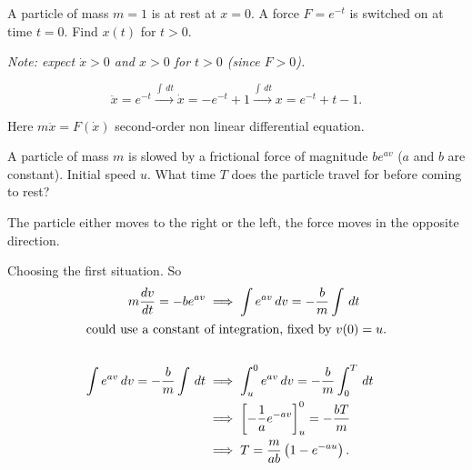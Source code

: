\documentclass[10pt, a4paper]{article}
\begin{document}
\begin{example}
    A particle of mass $m = 1$ is at rest at $x = 0$.
    A force $F = e ^ {-t}$ is switched on at time $t = 0$.
    Find $x(t)$ for $t > 0$.

    \textit{Note:
    expect $\dot{x} > 0$ and $x > 0$ for $t > 0$
    (since $F > 0$).}

    \begin{solution}
        \[
        \ddot{x} = e ^ {-t} \xrightarrow{\int\,dt} \dot{x} = -e ^ {-t} + 1 \xrightarrow{\int\,dt} x = e ^ {-t} + t - 1.
        \]
    \end{solution}
\end{example}

\begin{remark}
    Here $m\ddot{x} = F(\dot{x})$ second-order non linear differential equation.
\end{remark}

\begin{example}
    A particle of mass $m$ is slowed by a frictional force of magnitude $be ^ {av}$
    ($a$ and $b$ are constant).
    Initial speed $u$.
    What time $T$ does the particle travel for before coming to rest?
    
    \begin{solution}
        The particle either moves to the right or the left,
        the force moves in the opposite direction.

        Choosing the first situation.
        So
        \begin{align*}
            m\frac{dv}{dt} = -be ^ {av} &\implies \int e ^ {av}\,dv = -\frac{b}{m}\int\,dt \\
            \intertext{could use a constant of integration,
            fixed by $v(0) = u$.} \\
            \int e ^ {av}\,dv = -\frac{b}{m}\int\,dt &\implies \int_{u}^{0} e ^ {av}\,dv = -\frac{b}{m}\int_{0}^{T}\,dt \\
            &\implies \left[-\frac{1}{a}e ^ {-av}\right]_{u}^{0} = -\frac{bT}{m} \\
            &\implies T = \frac{m}{ab}\left(1 - e ^ {-au}\right).
        \end{align*}
    \end{solution}
\end{example}
\end{document}
